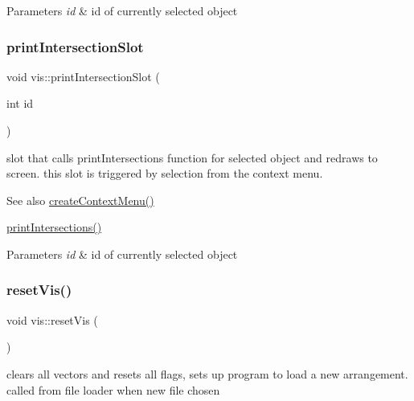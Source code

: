 \begin{DoxyParams}{Parameters}
{\em id} & id of currently selected object \\
\hline
\end{DoxyParams}
\mbox{\label{classvis_a192e67455047ca991fb29fbd4074c11d}} 
\subsubsection{\texorpdfstring{print\+Intersection\+Slot}{printIntersectionSlot}}
{\footnotesize\ttfamily void vis\+::print\+Intersection\+Slot (\begin{DoxyParamCaption}\item[{int}]{id }\end{DoxyParamCaption})\hspace{0.3cm}{\ttfamily [slot]}}

slot that calls print\+Intersections function for selected object and redraws to screen. this slot is triggered by selection from the context menu.

\begin{DoxySeeAlso}{See also}
\mbox{\hyperlink{classvis_a63af66f730f0f06f36d255bcc7a7a244}{create\+Context\+Menu()}} 

\mbox{\hyperlink{classvis_a9d087bde79e6856772dc3a1f6f89294e}{print\+Intersections()}} 
\end{DoxySeeAlso}

\begin{DoxyParams}{Parameters}
{\em id} & id of currently selected object \\
\hline
\end{DoxyParams}
\mbox{\label{classvis_a1ba44b07a81d5d205011112ea58d1252}} 
\subsubsection{\texorpdfstring{reset\+Vis()}{resetVis()}}
{\footnotesize\ttfamily void vis\+::reset\+Vis (\begin{DoxyParamCaption}{ }\end{DoxyParamCaption})}

clears all vectors and resets all flags, sets up program to load a new arrangement. called from file loader when new file chosen

